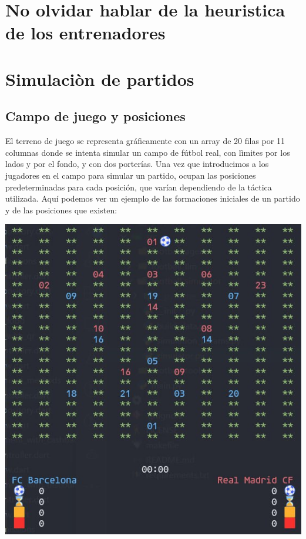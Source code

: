 \documentclass{article}
\begin{document}
    \section{No olvidar hablar de la heuristica de los entrenadores}
    \section{Simulaciòn de partidos}
    \subsection{Campo de juego y posiciones}
    El terreno de juego se representa gráficamente con un
array de 20 filas por 11 columnas donde se intenta simular un campo de fútbol real, con lìmites por los lados y por el fondo, y con dos porterías. Una vez que introducimos a los jugadores en el campo para simular un partido, ocupan las posiciones predeterminadas para cada posición, que varían dependiendo de la táctica utilizada. Aquí podemos ver un ejemplo de las formaciones iniciales de un
partido y de las posiciones que existen: 


\includegraphics*[width=1\textwidth]{terreno.jpg}
\bigskip
\end{document}
